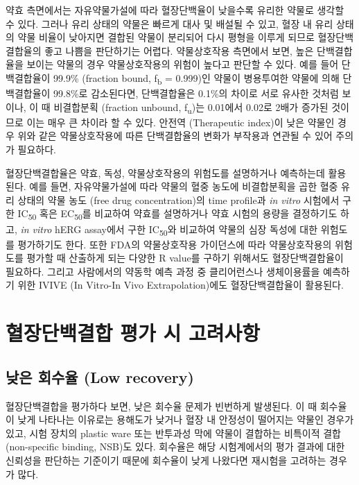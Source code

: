 \documentclass[
  11pt,
  krantz2, a4paper, twoside]{krantz}
\begin{document}
약효 측면에서는 자유약물가설에 따라 혈장단백율이 낮을수록 유리한 약물로
생각할 수 있다. 그러나 유리 상태의 약물은 빠르게 대사 및 배설될 수 있고,
혈장 내 유리 상태의 약물 비율이 낮아지면 결합된 약물이 분리되어 다시
평형을 이루게 되므로 혈장단백결합율의 좋고 나쁨을 판단하기는 어렵다.
약물상호작용 측면에서 보면, 높은 단백결합율을 보이는 약물의 경우
약물상호작용의 위험이 높다고 판단할 수 있다. 예를 들어 단백결합율이
99.9\% (fraction bound, f\textsubscript{b} = 0.999)인 약물이 병용투여한 약물에 의해
단백결합율이 99.8\%로 감소된다면, 단백결합율은 0.1\%의 차이로 서로 유사한
것처럼 보이나, 이 때 비결합분획 (fraction unbound, f\textsubscript{u})는 0.01에서
0.02로 2배가 증가된 것이므로 이는 매우 큰 차이라 할 수 있다. 안전역
(Therapeutic index)이 낮은 약물인 경우 위와 같은 약물상호작용에 따른
단백결합율의 변화가 부작용과 연관될 수 있어 주의가 필요하다.

혈장단백결합율은 약효, 독성, 약물상호작용의 위험도를 설명하거나
예측하는데 활용된다. 예를 들면, 자유약물가설에 따라 약물의 혈중 농도에
비결합분획을 곱한 혈중 유리 상태의 약물 농도 (free drug concentration)의
time profile과 \emph{in vitro} 시험에서 구한 IC\textsubscript{50} 혹은 EC\textsubscript{50}를 비교하여
약효를 설명하거나 약효 시험의 용량을 결정하기도 하고, \emph{in vitro} hERG
assay에서 구한 IC\textsubscript{50}와 비교하여 약물의 심장 독성에 대한 위험도를
평가하기도 한다. 또한 FDA의 약물상호작용 가이던스에 따라 약물상호작용의
위험도를 평가할 때 산출하게 되는 다양한 R value를 구하기 위해서도
혈장단백결합율이 필요하다. 그리고 사람에서의 약동학 예측 과정 중
클리어런스나 생체이용률을 예측하기 위한 IVIVE (In Vitro-In Vivo
Extrapolation)에도 혈장단백결합율이 활용된다.

\section{혈장단백결합 평가 시 고려사항}\label{uxd608uxc7a5uxb2e8uxbc31uxacb0uxd569-uxd3c9uxac00-uxc2dc-uxace0uxb824uxc0acuxd56d}

\subsection{낮은 회수율 (Low recovery)}\label{uxb0aeuxc740-uxd68cuxc218uxc728-low-recovery}

혈장단백결합을 평가하다 보면, 낮은 회수율 문제가 빈번하게 발생된다. 이
때 회수율이 낮게 나타나는 이유로는 용해도가 낮거나 혈장 내
안정성이 떨어지는 약물인 경우가 있고, 시험 장치의 plastic ware 또는
반투과성 막에 약물이 결합하는 비특이적 결합(non-specific binding,
NSB)도 있다. 회수율은 해당 시험계에서의 평가 결과에 대한 신뢰성을
판단하는 기준이기 때문에 회수율이 낮게 나왔다면 재시험을 고려하는
경우가 많다.
\end{document}
